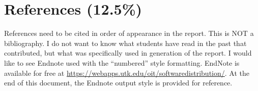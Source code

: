 \documentclass[12pt]{article}
\begin{document}
\section{References (12.5\%)}
References need to be cited in order of appearance in the report. This is NOT a bibliography. I do not want to know what students have read in the past that contributed, but what was specifically used in generation of the report. I would like to see Endnote used with the “numbered” style formatting. EndNote is available for free at \url{https://webapps.utk.edu/oit/softwaredistribution/}. At the end of this document, the Endnote output style is provided for reference.
\end{document}
